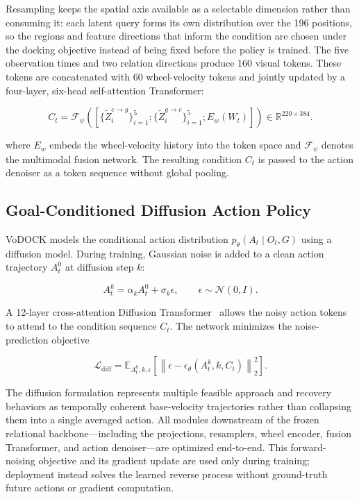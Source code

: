 \documentclass[letterpaper, 10 pt, conference]{IEEEtran}  %
\begin{document}
Resampling keeps the spatial axis available as a selectable dimension rather than consuming it: each latent query forms its own distribution over the 196 positions, so the regions and feature directions that inform the condition are chosen under the docking objective instead of being fixed before the policy is trained. The five observation times and two relation directions produce 160 visual tokens. These tokens are concatenated with 60 wheel-velocity tokens and jointly updated by a four-layer, six-head self-attention Transformer:

\begin{equation}
    C_t=\mathcal{F}_\psi
    \left(
    \left[
    \{\widetilde{Z}_i^{c\rightarrow g}\}_{i=1}^{5};
    \{\widetilde{Z}_i^{g\rightarrow c}\}_{i=1}^{5};
    E_w(W_t)
    \right]
    \right)
    \in\mathbb{R}^{220\times384}.
\end{equation}


where $E_w$ embeds the wheel-velocity history into the token space and $\mathcal{F}_\psi$ denotes the multimodal fusion network. The resulting condition $C_t$ is passed to the action denoiser as a token sequence without global pooling.

\subsection{Goal-Conditioned Diffusion Action Policy}
\label{subsec:diffusion_policy}

VoDOCK models the conditional action distribution $p_\theta(A_t\mid O_t,G)$ using a diffusion model. During training, Gaussian noise is added to a clean action trajectory $A_t^0$ at diffusion step $k$:

\begin{equation}
A_t^k=\alpha_k A_t^0+\sigma_k\epsilon,
\qquad
\epsilon\sim\mathcal{N}(0,I).
\end{equation}

A 12-layer cross-attention Diffusion Transformer~\cite{peebles2023dit} allows the noisy action tokens to attend to the condition sequence $C_t$. The network minimizes the noise-prediction objective

\begin{equation}
    \mathcal{L}_{\mathrm{diff}}
=
\mathbb{E}_{A_t^0,k,\epsilon}
\left[
\left\|
\epsilon-\epsilon_\theta(A_t^k,k,C_t)
\right\|_2^2
\right].
\end{equation}

The diffusion formulation represents multiple feasible approach and recovery behaviors as temporally coherent base-velocity trajectories rather than collapsing them into a single averaged action. All modules downstream of the frozen relational backbone---including the projections, resamplers, wheel encoder, fusion Transformer, and action denoiser---are optimized end-to-end. This forward-noising objective and its gradient update are used only during training; deployment instead solves the learned reverse process without ground-truth future actions or gradient computation.
\end{document}

